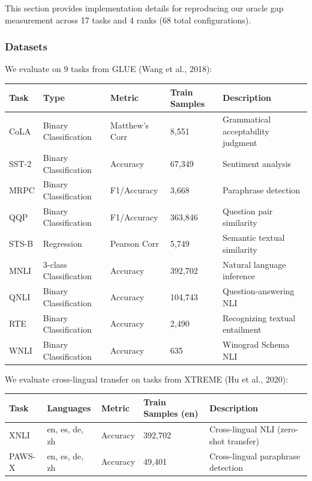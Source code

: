 
This section provides implementation details for reproducing our oracle gap measurement across 17 tasks and 4 ranks (68 total configurations).

\subsubsection{Datasets}

We evaluate on 9 tasks from GLUE (Wang et al., 2018):

\begin{table}[htbp]
\centering
\begin{tabular}{lllll}
\toprule
Task & Type & Metric & Train Samples & Description \\
\midrule
CoLA & Binary Classification & Matthew's Corr & 8,551 & Grammatical acceptability judgment \\
SST-2 & Binary Classification & Accuracy & 67,349 & Sentiment analysis \\
MRPC & Binary Classification & F1/Accuracy & 3,668 & Paraphrase detection \\
QQP & Binary Classification & F1/Accuracy & 363,846 & Question pair similarity \\
STS-B & Regression & Pearson Corr & 5,749 & Semantic textual similarity \\
MNLI & 3-class Classification & Accuracy & 392,702 & Natural language inference \\
QNLI & Binary Classification & Accuracy & 104,743 & Question-answering NLI \\
RTE & Binary Classification & Accuracy & 2,490 & Recognizing textual entailment \\
WNLI & Binary Classification & Accuracy & 635 & Winograd Schema NLI \\
\bottomrule
\end{tabular}
\end{table}

We evaluate cross-lingual transfer on tasks from XTREME (Hu et al., 2020):

\begin{table}[htbp]
\centering
\begin{tabular}{lllll}
\toprule
Task & Languages & Metric & Train Samples (en) & Description \\
\midrule
XNLI & en, es, de, zh & Accuracy & 392,702 & Cross-lingual NLI (zero-shot transfer) \\
PAWS-X & en, es, de, zh & Accuracy & 49,401 & Cross-lingual paraphrase detection \\
\bottomrule
\end{tabular}
\end{table}

